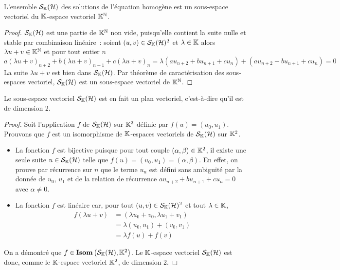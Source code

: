 \begin{prop}
  L'ensemble \(\mathcal{S}_{\mathbb{K}}(\mathcal{H})\) des solutions de l'équation homogène est un sous-espace vectoriel du \(\mathbb{K}\)-espace vectoriel \(\mathbb{K}^{\mathbb{N}}\).
\end{prop}
\begin{proof}
  \(\mathcal{S}_{\mathbb{K}}(\mathcal{H})\) est une partie de \(\mathbb{K}^{\mathbb{N}}\) non vide, puisqu'elle contient la suite nulle et stable par combinaison linéaire~:
  soient \((u,v) \in \mathcal{S}_{\mathbb{K}}(\mathcal{H})^2\) et \(\lambda \in \mathbb{K}\) alors \(\lambda u +v \in \mathbb{K}^{\mathbb{N}}\) et pour tout entier \(n\)
  \begin{equation}
    a(\lambda u+v)_{n+2} +b(\lambda u+v)_{n+1} +c(\lambda u+v)_n = \lambda (au_{n+2}+bu_{n+1}+cu_n) + (au_{n+2}+bu_{n+1}+cu_n)=0
  \end{equation}
  La suite \(\lambda u+v\) est bien dans \(\mathcal{S}_{\mathbb{K}}(\mathcal{H})\). Par théorème de caractérisation des sous-espaces vectoriel, \(\mathcal{S}_{\mathbb{K}}(\mathcal{H})\) est un sous-espace vectoriel de \(\mathbb{K}^{\mathbb{N}}\).
\end{proof}

\begin{prop}
  Le sous-espace vectoriel \(\mathcal{S}_{\mathbb{K}}(\mathcal{H})\) est en fait un plan vectoriel, c'est-à-dire qu'il est de dimension 2.
\end{prop}
\begin{proof}
  Soit l'application \(f\) de \(\mathcal{S}_{\mathbb{K}}(\mathcal{H})\) sur \(\mathbb{K}^2\) définie par \(f(u)=(u_0,u_1)\). Prouvons que \(f\) est un isomorphisme de \(\mathbb{K}\)-espaces vectoriels de \(\mathcal{S}_{\mathbb{K}}(\mathcal{H})\) sur \(\mathbb{K}^2\).
  \begin{itemize}
    \item La fonction \(f\) est bijective puisque pour tout couple \((\alpha, \beta) \in \mathbb{K}^2\), il existe une seule suite \(u \in \mathcal{S}_{\mathbb{K}}(\mathcal{H})\) telle que \(f(u)=(u_0,u_1)=(\alpha,\beta)\). En effet, on prouve par récurrence sur \(n\) que le terme \(u_n\) est défini sans ambiguïté par la donnée de \(u_0\), \(u_1\) et de la relation de récurrence \(au_{n+2}+bu_{n+1}+cu_n=0\) avec \(\alpha \neq 0\).
    \item La fonction \(f\) est linéaire car, pour tout \((u,v) \in \mathcal{S}_{\mathbb{K}}(\mathcal{H})^2\) et tout \(\lambda \in \mathbb{K}\),
      \begin{align}
        f(\lambda u+v) &=(\lambda u_0 +v_0, \lambda u_1+v_1) \\
                       &=\lambda (u_0,u_1) +(v_0,v_1)\\
                       &=\lambda f(u)+f(v)
      \end{align}
  \end{itemize}
  On a démontré que \(f \in \mathbf{Isom}\left(\mathcal{S}_{\mathbb{K}}(\mathcal{H}),\mathbb{K}^2\right)\). Le \(\mathbb{K}\)-espace vectoriel \(\mathcal{S}_{\mathbb{K}}(\mathcal{H})\) est donc, comme le \(\mathbb{K}\)-espace vectoriel \(\mathbb{K}^2\), de dimension 2.
\end{proof}

